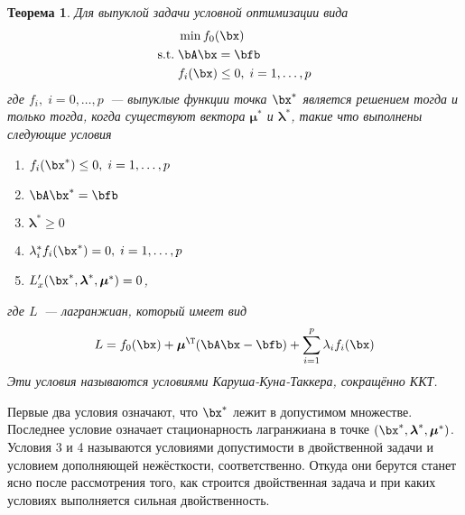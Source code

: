 \documentclass[12pt]{article}
\newcommand{\bmu}{\boldsymbol{\mu}}
\newcommand{\blambda}{\boldsymbol{\lambda}}
\newtheorem{Th}{Теорема}
\begin{document}
\begin{Th}
Для выпуклой задачи условной оптимизации вида
\begin{equation*}
\begin{split}
& \min f_0(\bx)\\
\mathrm{s.t. \;} & \bA\bx = \bfb \\
& f_i(\bx) \leq 0, \; i = 1,\ldots, p
\end{split}
\end{equation*}
где $f_i, \; i=0, \ldots, p$~--- выпуклые функции точка $\bx^*$ является решением тогда и только тогда, когда существуют вектора $\bmu^*$ и $\blambda^*$, такие что выполнены следующие условия
\begin{enumerate}
\item $f_i(\bx^*) \leq 0, \; i = 1,\ldots,p$
\item $\bA\bx^* = \bfb$
\item $\blambda^* \geq 0$
\item $\lambda_i^* f_i(\bx^*) = 0, \; i = 1,\ldots, p$
\item $L'_x (\bx^*, \blambda^*, \bmu^*) = 0$,
\end{enumerate}
где $L$~--- лагранжиан, который имеет вид
\[
L = f_0(\bx) + \bmu^{\T}(\bA\bx - \bfb) + \sum_{i=1}^p\lambda_i f_i(\bx)
\]
Эти условия называются условиями Каруша-Куна-Таккера, сокращённо ККТ. 
\end{Th}

Первые два условия означают, что $\bx^*$ лежит в допустимом множестве.
Последнее условие означает стационарность лагранжиана в точке $(\bx^*, \blambda^*, \bmu^*)$.
Условия 3 и 4 называются условиями допустимости в двойственной задачи и условием дополняющей нежёсткости, соответственно.
Откуда они берутся станет ясно после рассмотрения того, как строится двойственная задача и при каких условиях выполняется сильная двойственность. 
\end{document}
